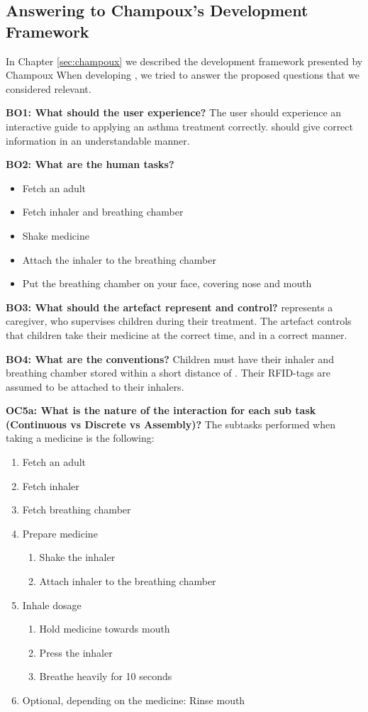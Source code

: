 \subsection{Answering to Champoux's Development Framework}
\label{sec:answeringchampoux}
In Chapter \ref{sec:champoux} we described the development framework presented by Champoux \etal{} When developing \buddy{}, we tried to answer the proposed questions that we considered relevant. 

\textbf{BO1: What should the user experience?}
The user should experience an interactive guide to applying an asthma treatment correctly. \buddy{} should give correct information in an understandable manner. 


\textbf{BO2: What are the human tasks?}
\begin{itemize}
  \item Fetch an adult
  \item Fetch inhaler and breathing chamber
  \item Shake medicine
  \item Attach the inhaler to the breathing chamber
  \item Put the breathing chamber on your face, covering nose and mouth
\end{itemize}

\textbf{BO3: What should the artefact represent and control?}
\buddy{} represents a caregiver, who supervises children during their treatment. The artefact controls that children take their medicine at the correct time, and in a correct manner.   

\textbf{BO4: What are the conventions?}
Children must have their inhaler and breathing chamber stored within a short distance of \buddy{}. Their RFID-tags are assumed to be attached to their inhalers.    

\textbf{OC5a: What is the nature of the interaction for each sub task (Continuous vs Discrete vs Assembly)?}
The subtasks performed when taking a medicine is the following:
\begin{enumerate}
  \itemsep0em
  \item Fetch an adult
  \item Fetch inhaler
  \item Fetch breathing chamber
  \item Prepare medicine
  	\begin{enumerate}
  	  \itemsep0em
  	  \item Shake the inhaler
  	  \item Attach inhaler to the breathing chamber
  	 \end{enumerate}
  \item Inhale dosage
  	\begin{enumerate}
  	  \itemsep0em
  	  \item Hold medicine towards mouth
  	  \item Press the inhaler
  	  \item Breathe heavily for 10 seconds
  	 \end{enumerate}
  \item Optional, depending on the medicine: Rinse mouth
\end{enumerate}

